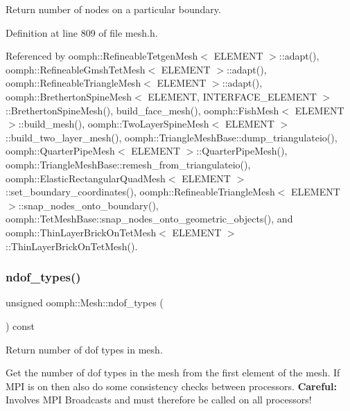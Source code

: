 Return number of nodes on a particular boundary. 



Definition at line 809 of file mesh.\+h.



Referenced by oomph\+::\+Refineable\+Tetgen\+Mesh$<$ E\+L\+E\+M\+E\+N\+T $>$\+::adapt(), oomph\+::\+Refineable\+Gmsh\+Tet\+Mesh$<$ E\+L\+E\+M\+E\+N\+T $>$\+::adapt(), oomph\+::\+Refineable\+Triangle\+Mesh$<$ E\+L\+E\+M\+E\+N\+T $>$\+::adapt(), oomph\+::\+Bretherton\+Spine\+Mesh$<$ E\+L\+E\+M\+E\+N\+T, I\+N\+T\+E\+R\+F\+A\+C\+E\+\_\+\+E\+L\+E\+M\+E\+N\+T $>$\+::\+Bretherton\+Spine\+Mesh(), build\+\_\+face\+\_\+mesh(), oomph\+::\+Fish\+Mesh$<$ E\+L\+E\+M\+E\+N\+T $>$\+::build\+\_\+mesh(), oomph\+::\+Two\+Layer\+Spine\+Mesh$<$ E\+L\+E\+M\+E\+N\+T $>$\+::build\+\_\+two\+\_\+layer\+\_\+mesh(), oomph\+::\+Triangle\+Mesh\+Base\+::dump\+\_\+triangulateio(), oomph\+::\+Quarter\+Pipe\+Mesh$<$ E\+L\+E\+M\+E\+N\+T $>$\+::\+Quarter\+Pipe\+Mesh(), oomph\+::\+Triangle\+Mesh\+Base\+::remesh\+\_\+from\+\_\+triangulateio(), oomph\+::\+Elastic\+Rectangular\+Quad\+Mesh$<$ E\+L\+E\+M\+E\+N\+T $>$\+::set\+\_\+boundary\+\_\+coordinates(), oomph\+::\+Refineable\+Triangle\+Mesh$<$ E\+L\+E\+M\+E\+N\+T $>$\+::snap\+\_\+nodes\+\_\+onto\+\_\+boundary(), oomph\+::\+Tet\+Mesh\+Base\+::snap\+\_\+nodes\+\_\+onto\+\_\+geometric\+\_\+objects(), and oomph\+::\+Thin\+Layer\+Brick\+On\+Tet\+Mesh$<$ E\+L\+E\+M\+E\+N\+T $>$\+::\+Thin\+Layer\+Brick\+On\+Tet\+Mesh().

\mbox{\label{classoomph_1_1Mesh_a16225f0094eeb234460f6cf963099c85}} 
\subsubsection{\texorpdfstring{ndof\+\_\+types()}{ndof\_types()}}
{\footnotesize\ttfamily unsigned oomph\+::\+Mesh\+::ndof\+\_\+types (\begin{DoxyParamCaption}{ }\end{DoxyParamCaption}) const}



Return number of dof types in mesh. 

Get the number of dof types in the mesh from the first element of the mesh. If M\+PI is on then also do some consistency checks between processors. {\bfseries Careful\+:} Involves M\+PI Broadcasts and must therefore be called on all processors! 

